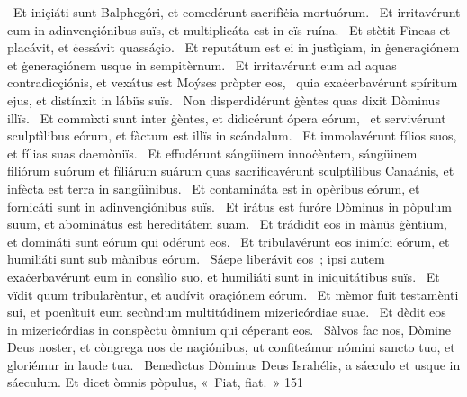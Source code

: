 {~Et iniçiáti sunt Balphegóri, et comedérunt sacrifìċia mortuórum.
~Et irritavérunt eum in adinvençiónibus suïs, et multiplicáta est in eïs ruína.
~Et stètit Fìneas et placávit, et ċessávit quassáçio.
~Et reputátum est ei in justìçiam, in ġeneraçiónem et ġeneraçiónem usque in sempitèrnum.
~Et irritavérunt eum ad aquas contradicçiónis, et vexátus est Moýses pròpter eos,
~quia exaċerbavérunt spíritum ejus, et distínxit in lábiïs suïs.
~Non disperdidérunt ġèntes quas dixit Dòminus illïs.
~Et commìxti sunt inter ġèntes, et didicérunt ópera eórum,
~et servivérunt sculptìlibus eórum, et fàctum est illïs in scándalum.
~Et immolavérunt fílios suos, et fílias suas daemòniïs.
~Et effudérunt sángüinem innoċèntem, sángüinem filiórum suórum et fïliárum suárum quas sacrificavérunt sculptìlibus Canaánis, et infècta est terra in sangüìnibus.
~Et contamináta est in opèribus eórum, et fornicáti sunt in adinvençiónibus suïs.
~Et irátus est furóre Dòminus in pòpulum suum, et abominátus est hereditátem suam.
~Et trádidit eos in mànüs ġèntium, et domináti sunt eórum qui odérunt eos.
~Et tribulavérunt eos inimíci eórum, et humiliáti sunt sub mànibus eórum.
~Sáepe liberávit eos~; ìpsi autem exaċerbavérunt eum in consìlio suo, et humiliáti sunt in iniquitátibus suïs.
~Et vïdit quum tribularèntur, et audívit oraçiónem eórum.
~Et mèmor fuit testamènti sui, et poenìtuit eum secùndum multitúdinem mizericórdiae suae.
~Et dèdit eos in mizericórdias in conspèctu òmnium qui céperant eos.
~Sàlvos fac nos, Dòmine Deus noster, et còngrega nos de naçiónibus, ut confiteámur nómini sancto tuo, et gloriémur in laude tua.
~Benedìctus Dòminus Deus Israhélis, a sáeculo et usque in sáeculum. Et dicet òmnis pòpulus, «~Fiat, fiat.~»}
{15}{1}
